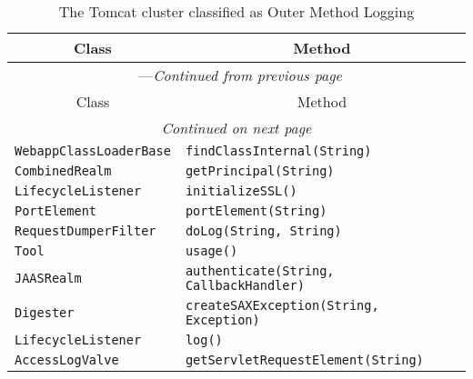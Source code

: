 \begin{center}
\begin{longtable}{ll}
\caption{The Tomcat cluster classified as Outer Method Logging}\\
\toprule\multicolumn{1}{c}{Class}&\multicolumn{1}{c}{Method}\\\midrule
\endfirsthead

\multicolumn{2}{c}{\tablename\ \thetable{}---\textit{Continued from previous page}} \\\midrule
\multicolumn{1}{c}{Class}&\multicolumn{1}{c}{Method}\\\midrule
\endhead
\multicolumn{2}{c}{\textit{Continued on next page}}\\\midrule
\endfoot
\bottomrule
\endlastfoot

\lstinline/WebappClassLoaderBase/&{\lstinline/findClassInternal(String)/}\\
\lstinline/CombinedRealm/&{\lstinline/getPrincipal(String)/}\\
\lstinline/LifecycleListener/&{\lstinline/initializeSSL()/}\\
\lstinline/PortElement/&{\lstinline/portElement(String)/}\\
\lstinline/RequestDumperFilter/&{\lstinline/doLog(String, String)/}\\
\lstinline/Tool/&{\lstinline/usage()/}\\
\lstinline/JAASRealm/&{\lstinline/authenticate(String, CallbackHandler)/}\\
\lstinline/Digester/&{\lstinline/createSAXException(String, Exception)/}\\
\lstinline/LifecycleListener/&{\lstinline/log()/}\\
\lstinline/AccessLogValve/&{\lstinline/getServletRequestElement(String)/}\\
\end{longtable}
\end{center}

